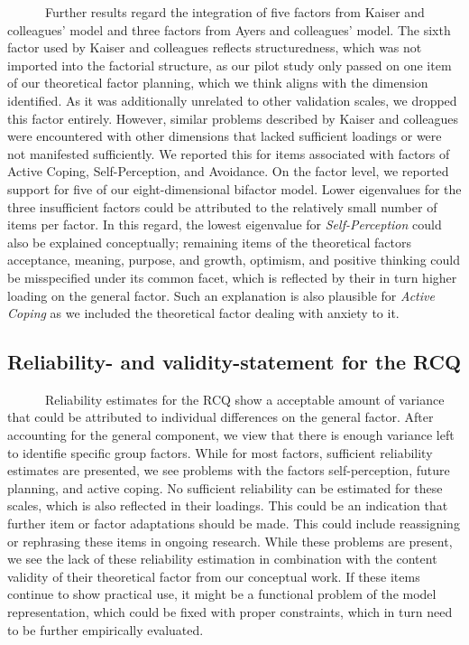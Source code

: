 \documentclass[
  man,floatsintext]{apa7}
\begin{document}
~~~~~~Further results regard the integration of five factors from Kaiser and colleagues' model and three factors from Ayers and colleagues' model. The sixth factor used by Kaiser and colleagues reflects structuredness, which was not imported into the factorial structure, as our pilot study only passed on one item of our theoretical factor planning, which we think aligns with the dimension identified. As it was additionally unrelated to other validation scales, we dropped this factor entirely. However, similar problems described by Kaiser and colleagues were encountered with other dimensions that lacked sufficient loadings or were not manifested sufficiently. We reported this for items associated with factors of Active Coping, Self-Perception, and Avoidance. On the factor level, we reported support for five of our eight-dimensional bifactor model. Lower eigenvalues for the three insufficient factors could be attributed to the relatively small number of items per factor. In this regard, the lowest eigenvalue for \emph{Self-Perception} could also be explained conceptually; remaining items of the theoretical factors acceptance, meaning, purpose, and growth, optimism, and positive thinking could be misspecified under its common facet, which is reflected by their in turn higher loading on the general factor. Such an explanation is also plausible for \emph{Active Coping} as we included the theoretical factor dealing with anxiety to it.

\subsection{Reliability- and validity-statement for the RCQ}\label{reliability--and-validity-statement-for-the-rcq}

~~~~~~Reliability estimates for the RCQ show a acceptable amount of variance that could be attributed to individual differences on the general factor. After accounting for the general component, we view that there is enough variance left to identifie specific group factors. While for most factors, sufficient reliability estimates are presented, we see problems with the factors self-perception, future planning, and active coping. No sufficient reliability can be estimated for these scales, which is also reflected in their loadings. This could be an indication that further item or factor adaptations should be made. This could include reassigning or rephrasing these items in ongoing research. While these problems are present, we see the lack of these reliability estimation in combination with the content validity of their theoretical factor from our conceptual work. If these items continue to show practical use, it might be a functional problem of the model representation, which could be fixed with proper constraints, which in turn need to be further empirically evaluated.
\end{document}
